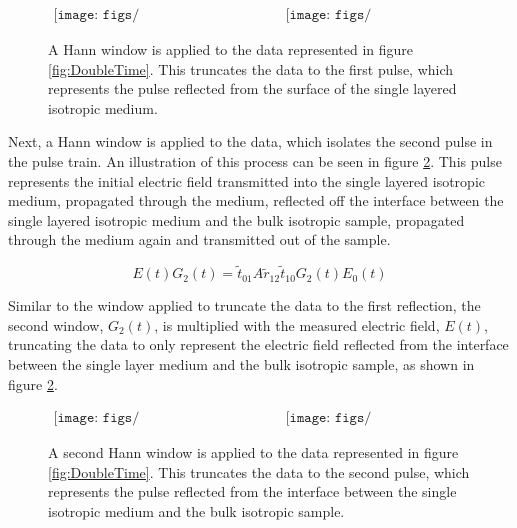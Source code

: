 \begin{figure}[H]
                \begin{center}$
								\begin{array}{cc}
                \texttt{[image: figs/TwoLayerWaterTimeWindow125.png]}&
                \texttt{[image: figs/TwoLayerWaterTimeWindow1app25.png]}
								\end{array}$
								\end{center}
	\caption[Application of Hann window to truncate to first pulse]{A Hann window is applied to the data represented in figure \ref{fig:DoubleTime}. This truncates the data to the first pulse, which represents the pulse reflected from the surface of the single layered isotropic medium.}
	\label{fig:DoubleGauss1}
\end{figure}

Next, a Hann window is applied to the data, which isolates the second pulse in the pulse train. An illustration of this process can be seen in figure \ref{fig:DoubleGauss2}. This pulse represents the initial electric field transmitted into the single layered isotropic medium, propagated through the medium, reflected off the interface between the single layered isotropic medium and the bulk isotropic sample, propagated through the medium again and transmitted out of the sample.

\begin{equation}
E(t)G_{2}(t) = \widetilde{t}_{01}A\widetilde{r}_{12}\widetilde{t}_{10}G_{2}(t)E_{0}(t)
\label{eq:Gaussian2}
\end{equation}

Similar to the window applied to truncate the data to the first reflection, the second window, $G_{2}(t)$, is multiplied with the measured electric field, $E(t)$, truncating the data to only represent the electric field reflected from the interface between the single layer medium and the bulk isotropic sample, as shown in figure \ref{fig:DoubleGauss2}.

\begin{figure}[H]
                \begin{center}$
								\begin{array}{cc}
                \texttt{[image: figs/TwoLayerWaterTimeWindow225.png]}&
                \texttt{[image: figs/TwoLayerWaterTimeWindow2app25.png]}
								\end{array}$
								\end{center}
	\caption[Application of Hann window to truncate to second pulse]{A second Hann window is applied to the data represented in figure \ref{fig:DoubleTime}. This truncates the data to the second pulse, which represents the pulse reflected from the interface between the single isotropic medium and the bulk isotropic sample.}
	\label{fig:DoubleGauss2}
\end{figure}

